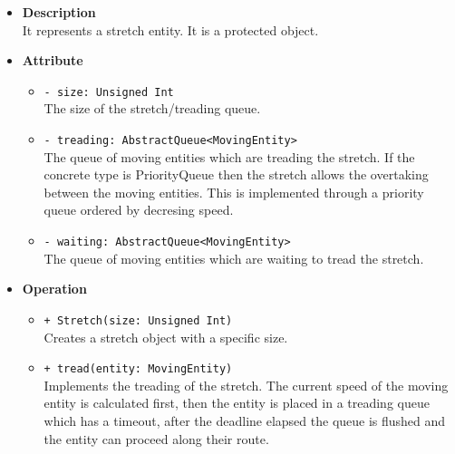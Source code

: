 \begin{itemize}
  \item \textbf{Description} \\
    It represents a stretch entity. It is a protected object.
  \item \textbf{Attribute}
  \begin{itemize}
    \item \texttt{- size: Unsigned Int} \\
The size of the stretch/treading queue.
    \item \texttt{- treading: AbstractQueue<MovingEntity>} \\
The queue of moving entities which are treading the stretch. If the concrete type
is PriorityQueue then the stretch allows the overtaking between the moving entities.
This is implemented through a priority queue ordered by decresing speed.
    \item \texttt{- waiting: AbstractQueue<MovingEntity>} \\
The queue of moving entities which are waiting to tread the stretch. 
  \end{itemize}
  \item \textbf{Operation}
  \begin{itemize}
    \item \texttt{+ Stretch(size: Unsigned Int)} \\
Creates a stretch object with a specific size.
    \item \texttt{+ tread(entity: MovingEntity)} \\
Implements the treading of the stretch. The current speed of the moving entity
is calculated first, then the entity is placed in a treading queue which has a  
timeout, after the deadline elapsed the queue is flushed and the entity can proceed
along their route.
  \end{itemize}
\end{itemize}

